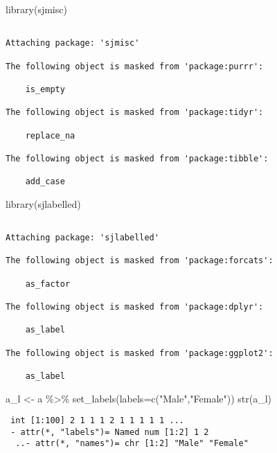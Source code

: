 \documentclass[
  letterpaper,
  DIV=11,
  numbers=noendperiod]{scrreprt}
\newenvironment{Shaded}{\begin{snugshade}}{\end{snugshade}}
\newcommand{\AttributeTok}[1]{\textcolor[rgb]{0.40,0.45,0.13}{#1}}
\newcommand{\FunctionTok}[1]{\textcolor[rgb]{0.28,0.35,0.67}{#1}}
\newcommand{\NormalTok}[1]{\textcolor[rgb]{0.00,0.23,0.31}{#1}}
\newcommand{\OtherTok}[1]{\textcolor[rgb]{0.00,0.23,0.31}{#1}}
\newcommand{\SpecialCharTok}[1]{\textcolor[rgb]{0.37,0.37,0.37}{#1}}
\newcommand{\StringTok}[1]{\textcolor[rgb]{0.13,0.47,0.30}{#1}}
\begin{document}
\begin{Shaded}
\begin{Highlighting}[]
\FunctionTok{library}\NormalTok{(sjmisc)}
\end{Highlighting}
\end{Shaded}

\begin{verbatim}

Attaching package: 'sjmisc'

The following object is masked from 'package:purrr':

    is_empty

The following object is masked from 'package:tidyr':

    replace_na

The following object is masked from 'package:tibble':

    add_case
\end{verbatim}

\begin{Shaded}
\begin{Highlighting}[]
\FunctionTok{library}\NormalTok{(sjlabelled)}
\end{Highlighting}
\end{Shaded}

\begin{verbatim}

Attaching package: 'sjlabelled'

The following object is masked from 'package:forcats':

    as_factor

The following object is masked from 'package:dplyr':

    as_label

The following object is masked from 'package:ggplot2':

    as_label
\end{verbatim}

\begin{Shaded}
\begin{Highlighting}[]
\NormalTok{a\_l }\OtherTok{\textless{}{-}}\NormalTok{ a }\SpecialCharTok{\%\textgreater{}\%}
  \FunctionTok{set\_labels}\NormalTok{(}\AttributeTok{labels=}\FunctionTok{c}\NormalTok{(}\StringTok{"Male"}\NormalTok{,}\StringTok{"Female"}\NormalTok{))}
\FunctionTok{str}\NormalTok{(a\_l)}
\end{Highlighting}
\end{Shaded}

\begin{verbatim}
 int [1:100] 2 1 1 1 2 1 1 1 1 1 ...
 - attr(*, "labels")= Named num [1:2] 1 2
  ..- attr(*, "names")= chr [1:2] "Male" "Female"
\end{verbatim}
\end{document}

